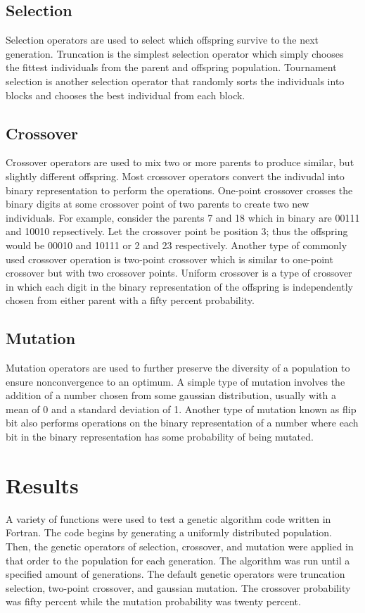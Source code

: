 \documentclass[12pt]{article}
\begin{document}
\subsection{Selection}
Selection operators are used to select which offspring survive to the next generation. Truncation is the simplest selection operator which simply chooses the fittest individuals from the parent and offspring population. Tournament selection is another selection operator that randomly sorts the individuals into blocks and chooses the best individual from each block.

\subsection{Crossover}
Crossover operators are used to mix two or more parents to produce similar, but slightly different offspring. Most crossover operators convert the indivudal into binary representation to perform the operations. One-point crossover crosses the binary digits at some crossover point of two parents to create two new individuals. For example, consider the parents 7 and 18 which in binary are 00111 and 10010 repsectively. Let the crossover point be position 3; thus the offspring would be 00010 and 10111 or 2 and 23 respectively. Another type of commonly used crossover operation is two-point crossover which is similar to one-point crossover but with two crossover points. Uniform crossover is a type of crossover in which each digit in the binary representation of the offspring is independently chosen from either parent with a fifty percent probability.

\subsection{Mutation}
Mutation operators are used to further preserve the diversity of a population to ensure nonconvergence to an optimum. A simple type of mutation involves the addition of a number chosen from some gaussian distribution, usually with a mean of 0 and a standard deviation of 1. Another type of mutation known as flip bit also performs operations on the binary representation of a number where each bit in the binary representation has some probability of being mutated.

\newpage
\section{Results}
A variety of functions were used to test a genetic algorithm code written in Fortran. The code begins by generating a uniformly distributed population. Then, the genetic operators of selection, crossover, and mutation were applied in that order to the population for each generation. The algorithm was run until a specified amount of generations. The default genetic operators were truncation selection, two-point crossover, and gaussian mutation. The crossover probability was fifty percent while the mutation probability was twenty percent.
\end{document}
